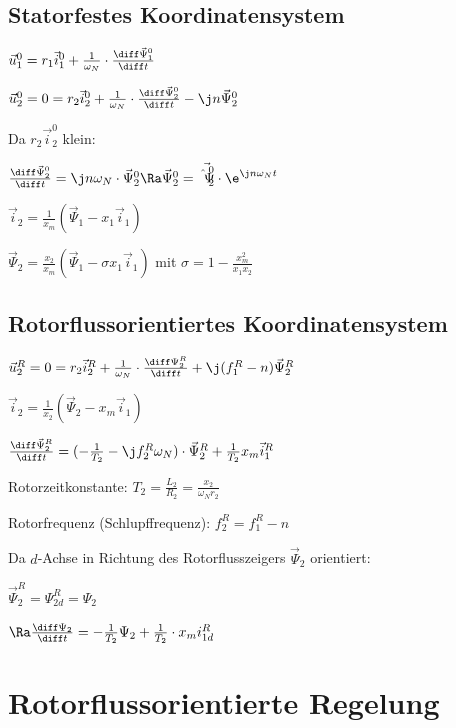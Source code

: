 \documentclass[fs, german]{latex4ei_fs}
\begin{document}
\begin{sectionbox}
\subsection{Statorfestes Koordinatensystem}

$\vec u_1^0 = r_1 \vec i_1^0 + \frac{1}{\omega_N} \cdot \frac{\diff \vec \Psi_1^0}{\diff t}$

$\vec u_2^0 = 0 = r_2 \vec i_2^0 + \frac{1}{\omega_N} \cdot \frac{\diff \vec \Psi_2^0}{\diff t} - \j n \vec \Psi_2^0$

Da $r_2 \vec i_2^0$ klein:

$\frac{\diff \vec \Psi_2^0}{\diff t} = \j n \omega_N \cdot \vec \Psi_2^0 \Ra \vec \Psi_2^0 = \vec{\hat \Psi_2^0} \cdot \e^{\j n \omega_N t}$

$\vec i_2 = \frac{1}{x_m} (\vec \Psi_1 - x_1 \vec i_1)$

$\vec \Psi_2 = \frac{x_2}{x_m} (\vec \Psi_1 - \sigma x_1 \vec i_1)$ mit $\sigma = 1 - \frac{x_m^2}{x_1 x_2}$

\end{sectionbox}
\begin{sectionbox}
\subsection{Rotorflussorientiertes Koordinatensystem}

$\vec u_2^R = 0 = r_2 \vec i_2^R + \frac{1}{\omega_N} \cdot \frac{\diff \Psi_2^R}{\diff t} + \j (f_1^R - n) \vec \Psi_2^R$

$\vec i_2 = \frac{1}{x_2} (\vec \Psi_2 - x_m \vec i_1)$

$\frac{\diff \vec \Psi_2^R}{\diff t} = (- \frac{1}{T_2} - \j f_2^R \omega_N) \cdot \vec \Psi_2^R + \frac{1}{T_2} x_m \vec i_1^R$ 

Rotorzeitkonstante: $T_2 = \frac{L_2}{R_2} = \frac{x_2}{\omega_N r_2}$

Rotorfrequenz (Schlupffrequenz): $f_2^R = f_1^R - n$

Da $d$-Achse in Richtung des Rotorflusszeigers $\vec \Psi_2$ orientiert:

$\vec \Psi_2^R = \Psi_{2d}^R = \Psi_2$

$\Ra \frac{\diff \Psi_2}{\diff t} = - \frac{1}{T_2} \Psi_2 + \frac{1}{T_2} \cdot x_m i_{1d}^R$
\end{sectionbox}


\section{Rotorflussorientierte Regelung} 
\end{document}
